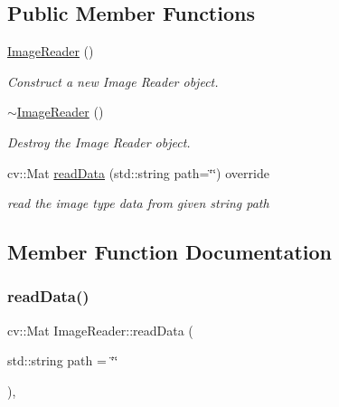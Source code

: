 \subsection*{Public Member Functions}
\begin{DoxyCompactItemize}
\item 
\mbox{\label{classImageReader_a2b24331603b06f5c218212c26a3ee24b}} 
\hyperlink{classImageReader_a2b24331603b06f5c218212c26a3ee24b}{Image\+Reader} ()
\begin{DoxyCompactList}\small\item\em Construct a new Image Reader object. \end{DoxyCompactList}\item 
\mbox{\label{classImageReader_a4d5b604cbc552bd86d9ec357139fd61e}} 
\hyperlink{classImageReader_a4d5b604cbc552bd86d9ec357139fd61e}{$\sim$\+Image\+Reader} ()
\begin{DoxyCompactList}\small\item\em Destroy the Image Reader object. \end{DoxyCompactList}\item 
cv\+::\+Mat \hyperlink{classImageReader_a453f68fc55ae911476514068873f9a3f}{read\+Data} (std\+::string path=\char`\"{}\char`\"{}) override
\begin{DoxyCompactList}\small\item\em read the image type data from given string path \end{DoxyCompactList}\end{DoxyCompactItemize}


\subsection{Member Function Documentation}
\mbox{\label{classImageReader_a453f68fc55ae911476514068873f9a3f}} 
\subsubsection{\texorpdfstring{read\+Data()}{readData()}}
{\footnotesize\ttfamily cv\+::\+Mat Image\+Reader\+::read\+Data (\begin{DoxyParamCaption}\item[{std\+::string}]{path = {\ttfamily \char`\"{}\char`\"{}} }\end{DoxyParamCaption})\hspace{0.3cm}{\ttfamily [override]}, {\ttfamily [virtual]}}



